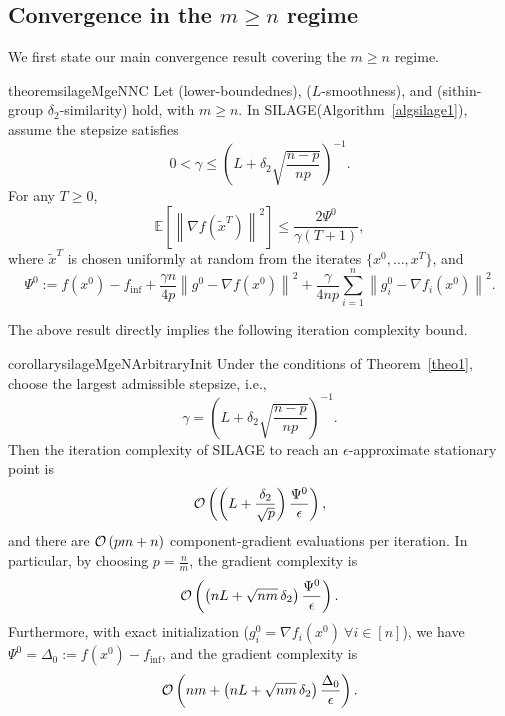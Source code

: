 \documentclass{article}
\newcommand{\bb}{\mathbb}
\newcommand{\sqn}[1]{\left\| #1 \right\|^2}
\newcommand{\nf}[1]{\nabla f\rb{#1}}
\newcommand{\cO}{{\cal O}}
\newcommand{\finf}{f_\mathrm{inf}}
\newcommand{\eqdef}{:=}
\newcommand{\Exp}[1]{{\bb E}\left[#1\right]}
\newcommand{\rb}[1]{\left(#1\right)}
\newcommand {\rbl}[1]{(#1)} %
\renewcommand{\nf}[1]{\nabla f\rbl{#1}}
\newcommand{\nfi}[1]{\nabla f_i\rbl{#1}}
\theoremstyle{plain}
\newcommand{\algno}{{\sf\scalefont{0.88}\color{mydarkgreen}SILAGE}\xspace}
\begin{document}
\subsection{Convergence in the $m \ge n$ regime}
\label{subsec:silage_mge_n_convergence}

We first state our main convergence result covering the $m\ge n$ regime.
\begin{restatable}{theorem}{silageMgeNNC}
\label{theo1}
Let  (lower-boundednes),  ($L$-smoothness), and  (sithin-group $\delta_2$-similarity) hold, with $m\ge n$. In \algno (Algorithm~\ref{algsilage1}),
assume the stepsize satisfies \[0<\gamma\le \rb{L+\delta_2\sqrt{\frac{n-p}{np}}}^{-1}.\] For any $T \ge 0$, 
\begin{equation}\label{eq:80y0f9u0df}  \Exp{\sqn{\nf{\tilde{x}^T}}} \le \frac{2\Psi^0}{\gamma(T+1)},\end{equation} where
 $\tilde{x}^T$ is chosen uniformly at random from the iterates $\{x^0,\ldots,x^T\}$, and
\[\Psi^0 \eqdef f(x^0)-\finf +\frac{\gamma n}{4p}\sqn{g^0-\nf{x^0}} +\frac{\gamma}{4np}\sum_{i=1}^n\sqn{g_i^0-\nfi{x^0}}.\]

\end{restatable}

The above result directly implies the following iteration complexity bound.
\begin{restatable}[Complexity, %
$m\ge n$]{corollary}{silageMgeNArbitraryInit}
\label{cor:silage_mge_n_arbitrary_init}
Under the conditions of Theorem~\ref{theo1}, choose the largest admissible stepsize, i.e., \[\gamma=\rb{L+\delta_2\sqrt{\frac{n-p}{np}}}^{-1}.\] Then the iteration complexity of \algno to reach an $\epsilon$-approximate stationary point is
\begin{equation}\label{eq:n8fy0dy80fd}\cO\rb{\rb{L+\frac{\delta_2}{\sqrt p}}\frac{\Psi^0}{\epsilon}},\end{equation}
and there are $\cO\rb{pm+n}$ component-gradient evaluations per iteration.
In particular, by choosing $p=\frac nm$, the gradient complexity is \[\cO\rb{\rb{nL+\sqrt{nm}\,\delta_2}\frac{\Psi^0}{\epsilon}}.\]
Furthermore, with
exact initialization ($g_i^0 = \nabla f_i(x^0)\ \forall i \in [n]$), we have $\Psi^0 = \Delta_0 \eqdef f(x^0) - \finf$, and the gradient complexity is
\[\cO\rb{nm + \rb{nL+\sqrt{nm}\,\delta_2}\frac{\Delta_0}{\epsilon}}.\]
\end{restatable}
\end{document}
